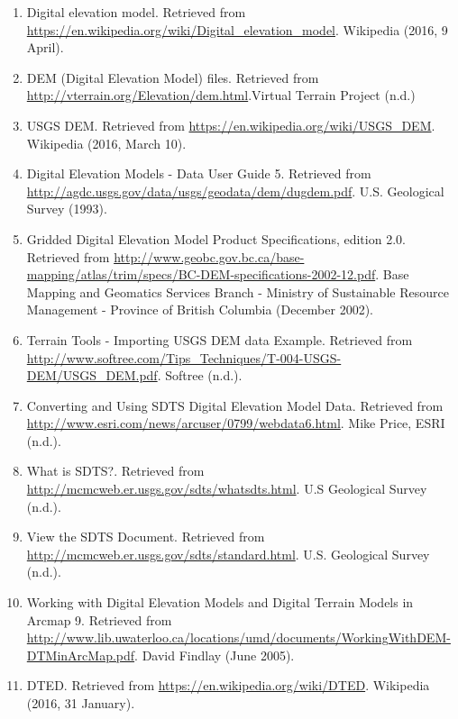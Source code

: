 \documentclass[11pt]{article}
\begin{document}
\begin{enumerate}[{(1)}]

\item Digital elevation model. Retrieved from \url{https://en.wikipedia.org/wiki/Digital_elevation_model}. Wikipedia (2016, 9 April).

\item DEM (Digital Elevation Model) files. Retrieved from \url{http://vterrain.org/Elevation/dem.html}.Virtual Terrain Project (n.d.)

\item USGS DEM. Retrieved from \url{https://en.wikipedia.org/wiki/USGS_DEM}. Wikipedia (2016, March 10).

\item Digital Elevation Models - Data User Guide 5. Retrieved from \url{http://agdc.usgs.gov/data/usgs/geodata/dem/dugdem.pdf}. U.S. Geological Survey (1993).

\item Gridded Digital Elevation Model Product Specifications, edition 2.0. Retrieved from \url{http://www.geobc.gov.bc.ca/base-mapping/atlas/trim/specs/BC-DEM-specifications-2002-12.pdf}. Base Mapping and Geomatics Services Branch - Ministry of Sustainable Resource Management - Province of British Columbia (December 2002).

\item Terrain Tools - Importing USGS DEM data Example. Retrieved from \url{http://www.softree.com/Tips_Techniques/T-004-USGS-DEM/USGS_DEM.pdf}. Softree (n.d.).

\item Converting and Using SDTS Digital Elevation Model Data. Retrieved from \url{http://www.esri.com/news/arcuser/0799/webdata6.html}. Mike Price, ESRI (n.d.). 

\item What is SDTS?. Retrieved from \url{http://mcmcweb.er.usgs.gov/sdts/whatsdts.html}. U.S Geological Survey (n.d.). 

\item 
View the SDTS Document. Retrieved from \url{http://mcmcweb.er.usgs.gov/sdts/standard.html}. U.S. Geological Survey (n.d.).

\item Working with Digital Elevation Models and Digital Terrain Models in Arcmap 9. Retrieved from \url{http://www.lib.uwaterloo.ca/locations/umd/documents/WorkingWithDEM-DTMinArcMap.pdf}. David Findlay (June 2005).

\item DTED. Retrieved from \url{https://en.wikipedia.org/wiki/DTED}. Wikipedia (2016, 31 January).


\end{enumerate}
\end{document}
